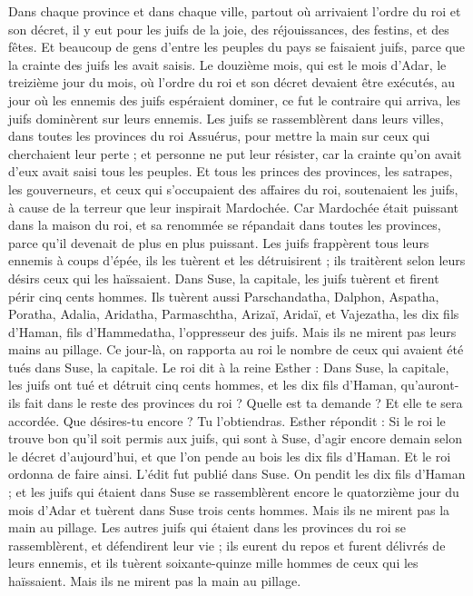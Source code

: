 \begin{multicols}{2}
Dans chaque province et dans chaque ville, partout où arrivaient l’ordre du roi et son décret, il y eut pour les juifs de la joie, des réjouissances, des festins, et des fêtes. Et beaucoup de gens d'entre les peuples du pays se faisaient juifs, parce que la crainte des juifs les avait saisis.
\VerseOne{}Le douzième mois, qui est le mois d'Adar, le treizième jour du mois, où l’ordre du roi et son décret devaient être exécutés, au jour où les ennemis des juifs espéraient dominer, ce fut le contraire qui arriva, les juifs dominèrent sur leurs ennemis.
Les juifs se rassemblèrent dans leurs villes, dans toutes les provinces du roi Assuérus, pour mettre la main sur ceux qui cherchaient leur perte ; et personne ne put leur résister, car la crainte qu'on avait d'eux avait saisi tous les peuples.
Et tous les princes des provinces, les satrapes, les gouverneurs, et ceux qui s’occupaient des affaires du roi, soutenaient les juifs, à cause de la terreur que leur inspirait Mardochée.
Car Mardochée était puissant dans la maison du roi, et sa renommée se répandait dans toutes les provinces, parce qu’il devenait de plus en plus puissant.
Les juifs frappèrent tous leurs ennemis à coups d'épée, ils les tuèrent et les détruisirent ; ils traitèrent selon leurs désirs ceux qui les haïssaient.
Dans Suse, la capitale, les juifs tuèrent et firent périr cinq cents hommes.
Ils tuèrent aussi Parschandatha, Dalphon, Aspatha,
Poratha, Adalia, Aridatha,
Parmaschtha, Arizaï, Aridaï, et Vajezatha,
les dix fils d'Haman, fils d'Hammedatha, l'oppresseur des juifs. Mais ils ne mirent pas leurs mains au pillage.
Ce jour-là, on rapporta au roi le nombre de ceux qui avaient été tués dans Suse, la capitale.
Le roi dit à la reine Esther : Dans Suse, la capitale, les juifs ont tué et détruit cinq cents hommes, et les dix fils d'Haman, qu'auront-ils fait dans le reste des provinces du roi ? Quelle est ta demande ? Et elle te sera accordée. Que désires-tu encore ? Tu l’obtiendras.
Esther répondit : Si le roi le trouve bon qu'il soit permis aux juifs, qui sont à Suse, d’agir encore demain selon le décret d’aujourd'hui, et que l'on pende au bois les dix fils d'Haman.
Et le roi ordonna de faire ainsi. L'édit fut publié dans Suse. On pendit les dix fils d'Haman ;
et les juifs qui étaient dans Suse se rassemblèrent encore le quatorzième jour du mois d'Adar et tuèrent dans Suse trois cents hommes. Mais ils ne mirent pas la main au pillage.
Les autres juifs qui étaient dans les provinces du roi se rassemblèrent, et défendirent leur vie ; ils eurent du repos et furent délivrés de leurs ennemis, et ils tuèrent soixante-quinze mille hommes de ceux qui les haïssaient. Mais ils ne mirent pas la main au pillage.

\end{multicols}
